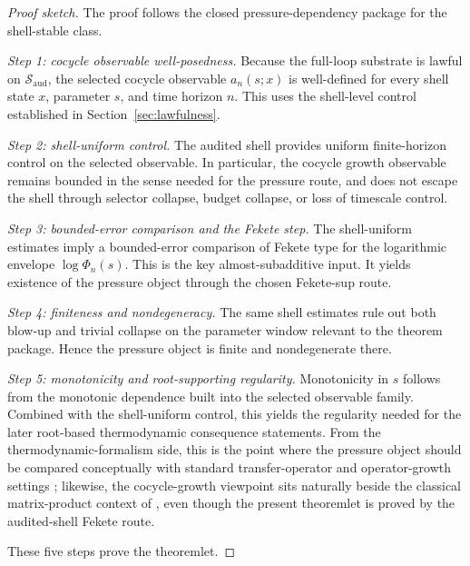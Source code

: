 \documentclass[11pt]{article}
\theoremstyle{definition}
\begin{document}
\begin{proof}[Proof sketch]
The proof follows the closed pressure-dependency package for the shell-stable class.

\smallskip
\noindent\emph{Step 1: cocycle observable well-posedness.}
Because the full-loop substrate is lawful on \(\mathcal{S}_{\mathrm{aud}}\), the selected cocycle observable \(a_n(s;x)\) is well-defined for every shell state \(x\), parameter \(s\), and time horizon \(n\). This uses the shell-level control established in Section~\ref{sec:lawfulness}.

\smallskip
\noindent\emph{Step 2: shell-uniform control.}
The audited shell provides uniform finite-horizon control on the selected observable. In particular, the cocycle growth observable remains bounded in the sense needed for the pressure route, and does not escape the shell through selector collapse, budget collapse, or loss of timescale control.

\smallskip
\noindent\emph{Step 3: bounded-error comparison and the Fekete step.}
The shell-uniform estimates imply a bounded-error comparison of Fekete type for the logarithmic envelope \(\log \Phi_n(s)\). This is the key almost-subadditive input. It yields existence of the pressure object through the chosen Fekete-sup route.

\smallskip
\noindent\emph{Step 4: finiteness and nondegeneracy.}
The same shell estimates rule out both blow-up and trivial collapse on the parameter window relevant to the theorem package. Hence the pressure object is finite and nondegenerate there.

\smallskip
\noindent\emph{Step 5: monotonicity and root-supporting regularity.}
Monotonicity in \(s\) follows from the monotonic dependence built into the selected observable family. Combined with the shell-uniform control, this yields the regularity needed for the later root-based thermodynamic consequence statements. From the thermodynamic-formalism side, this is the point where the pressure object should be compared conceptually with standard transfer-operator and operator-growth settings \cite{Ruelle1978ThermodynamicFormalism,Baladi2000TransferOperators}; likewise, the cocycle-growth viewpoint sits naturally beside the classical matrix-product context of \cite{FurstenbergKesten1960RandomMatrices,Oseledets1968MET}, even though the present theoremlet is proved by the audited-shell Fekete route.

These five steps prove the theoremlet.
\end{proof}
\end{document}
